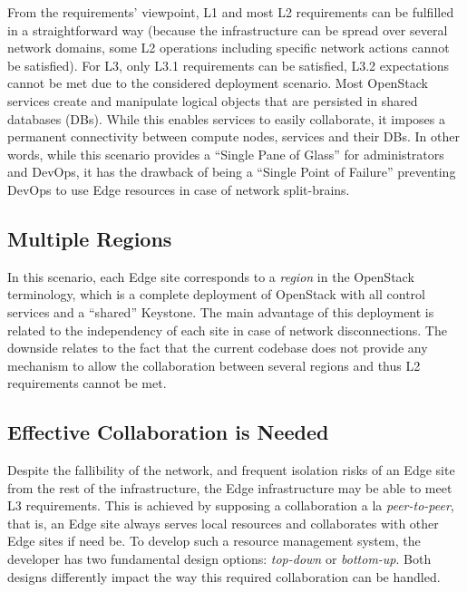 From the requirements' viewpoint, L1 and most L2 requirements can be
fulfilled in a straightforward way (because the infrastructure can be
spread over several network domains, some L2 operations including
specific network actions cannot be satisfied). For L3, only L3.1
requirements can be satisfied, L3.2 expectations cannot be met due to
the considered deployment scenario. Most OpenStack services create and
manipulate logical objects that are persisted in shared databases
(DBs). While this enables services to easily collaborate, it imposes
a permanent connectivity between compute nodes, services and their
DBs.  In other words, while this scenario provides a ``Single Pane of
Glass'' for administrators and DevOps, it has the drawback of being a
``Single Point of Failure'' preventing DevOps to use Edge resources in
case of network split-brains.

\subsection{Multiple Regions}
In this scenario, each Edge site corresponds to a \emph{region}
in the OpenStack terminology, which is a complete deployment of
OpenStack with all control services and a ``shared'' Keystone.
The main advantage of this deployment is related to the independency
of each site in case of network disconnections.
The downside relates to the fact that the current codebase does not
provide any mechanism to allow the collaboration between several
regions and thus L2 requirements cannot be met.~


\subsection{Effective Collaboration is Needed}
Despite the fallibility of the network, and frequent isolation risks
of an Edge site from the rest of the infrastructure, the Edge
infrastructure may be able to meet L3 requirements. This
is achieved by supposing a collaboration a la \emph{peer-to-peer},
that is, an Edge site always serves local resources and collaborates
with other Edge sites if need be. To develop such a resource
management system, the developer has two fundamental design options:
\emph{top-down} or \emph{bottom-up}. Both designs differently impact the way
this required collaboration can be handled.

